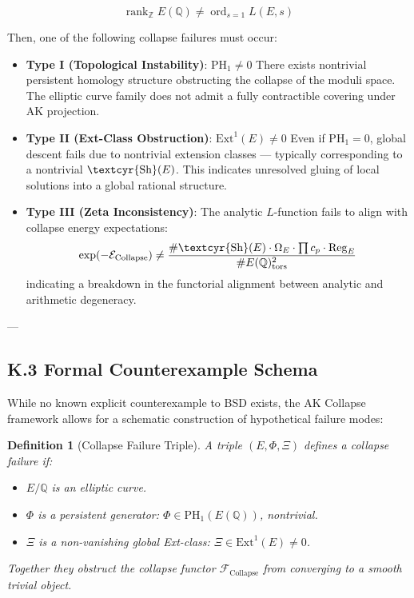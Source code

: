 \documentclass[11pt]{article}
\newtheorem{definition}[theorem]{Definition}
\newcommand{\Sha}{\text{\textcyr{Sh}}}
\begin{document}
\[
\operatorname{rank}_{\mathbb{Z}} E(\mathbb{Q}) \neq \operatorname{ord}_{s=1} L(E,s)
\]

Then, one of the following collapse failures must occur:

\begin{itemize}
  \item \textbf{Type I (Topological Instability)}: $\mathrm{PH}_1 \neq 0$  
  There exists nontrivial persistent homology structure obstructing the collapse of the moduli space. The elliptic curve family does not admit a fully contractible covering under AK projection.

  \item \textbf{Type II (Ext-Class Obstruction)}: $\mathrm{Ext}^1(E) \neq 0$  
  Even if $\mathrm{PH}_1 = 0$, global descent fails due to nontrivial extension classes — typically corresponding to a nontrivial $\Sha(E)$. This indicates unresolved gluing of local solutions into a global rational structure.

  \item \textbf{Type III (Zeta Inconsistency)}:  
  The analytic $L$-function fails to align with collapse energy expectations:
  \[
  \exp(-\mathcal{E}_{\text{Collapse}}) \neq \frac{\#\Sha(E)\cdot \Omega_E \cdot \prod c_p \cdot \operatorname{Reg}_E}{\# E(\mathbb{Q})_\text{tors}^2}
  \]
  indicating a breakdown in the functorial alignment between analytic and arithmetic degeneracy.
\end{itemize}

---

\subsection*{K.3 Formal Counterexample Schema}

While no known explicit counterexample to BSD exists, the AK Collapse framework allows for a schematic construction of hypothetical failure modes:

\begin{definition}[Collapse Failure Triple]
A triple $(E, \Phi, \Xi)$ defines a collapse failure if:
\begin{itemize}
  \item $E/\mathbb{Q}$ is an elliptic curve.
  \item $\Phi$ is a persistent generator: $\Phi \in \mathrm{PH}_1(E(\mathbb{Q}))$, nontrivial.
  \item $\Xi$ is a non-vanishing global Ext-class: $\Xi \in \mathrm{Ext}^1(E) \neq 0$.
\end{itemize}
Together they obstruct the collapse functor $\mathcal{F}_{\mathrm{Collapse}}$ from converging to a smooth trivial object.
\end{definition}
\end{document}
